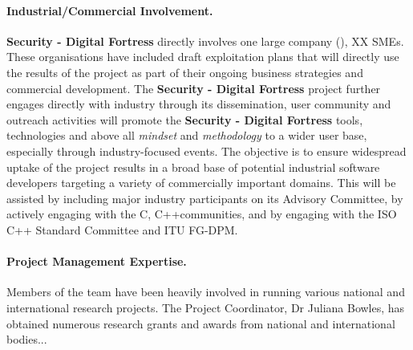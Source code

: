 \documentclass[a4paper,11pt]{article}
\newcommand{\project}[1]{\textbf{#1}\xspace}
\newcommand{\SECURITY}{\project{Security - Digital Fortress}}
\newcommand{\TheProject}{\SECURITY}
\begin{document}
\paragraph{Industrial/Commercial Involvement.}

\TheProject{} directly involves one large company (\IBMshort{}), 
XX SMEs.
These organisations have included draft exploitation plans that will directly use the results of the project
as part of their ongoing business strategies and commercial development.
The \TheProject{} project further engages directly with industry through its
dissemination, user community and outreach activities 
will promote the
\TheProject{} tools, technologies and above all \emph{mindset} and \emph{methodology} to a wider user base,
especially through industry-focused events. %
The objective is to ensure widespread uptake of the project results in a broad base of potential industrial
software developers targeting a variety of commercially important domains. %
This will be assisted by including major industry participants on its Advisory Committee,
by actively engaging with the C, C++communities, and by engaging with the ISO C++ Standard Committee and ITU FG-DPM.


\paragraph{Project Management Expertise.}

Members of the team have been heavily involved in running
various national and international research projects.  The
Project Coordinator, Dr Juliana Bowles, has obtained numerous
research grants and awards from national and international
bodies...
\end{document}
